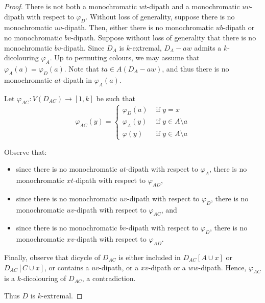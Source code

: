 \begin{proof}
    There is not both a monochromatic $wt$-dipath and a monochromatic $uv$-dipath with respect to $\varphi_D$. Without loss of generality, suppose there is no monochromatic $uv$-dipath. Then, either there is no monochromatic $ub$-dipath or no monochromatic $bv$-dipath.
    Suppose without loss of generality that there is no monochromatic $bv$-dipath. Since $D_{A}$ is $k$-extremal, $D_{A} - aw$ admits a $k$-dicolouring $\varphi_{A}$. 
    Up to permuting colours, we may assume that $\varphi_{A}(a) = \varphi_D(a)$. 
    Note that $ta \in A(D_{A} - aw)$, and thus there is no monochromatic $at$-dipath in $\varphi_{A}(a)$.

    Let $\varphi_{AC} : V(D_{AC}) \to [1,k]$ be such that
    $$
\varphi_{AC}(y) = \left\{
    \begin{array}{ll}
         \varphi_D(a) & \text{ if } y=x \\
        \varphi_{A}(y) & \text{ if } y \in A \setminus a \\
        \varphi(y) &  \text{ if }y \in A \setminus a
    \end{array}
\right.
$$


    Observe that: 
    \begin{itemize}
        \item since there is no monochromatic $at$-dipath with respect to $\varphi_{A}$, there is no monochromatic $xt$-dipath with respect to $\varphi_{AD}$, 
        \item since there is no monochromatic $uv$-dipath with respect to $\varphi_D$, there is no monochromatic $uv$-dipath with respect to $\varphi_{AC}$, and
        \item since there is no monochromatic $bv$-dipath with respect to $\varphi_{D}$, there is no monochromatic $xv$-dipath with respect to $\varphi_{AD}$. 
    \end{itemize}
    
     
    
    Finally, observe that dicycle of $D_{AC}$  is either included in $D_{AC}[A \cup x]$ or $D_{AC}[C \cup x]$, or contains a $uv$-dipath, or a $xv$-dipath or a $ww$-dipath. Hence, $\varphi_{AC}$ is a $k$-dicolouring of $D_{AC}$, a contradiction.

    \medskip
    Thus $D$ is $k$-extremal.

\end{proof}

